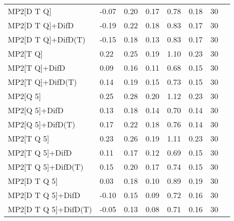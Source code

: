 \begin{table}
\begin{tabular}{l l l l l l l l }
    MP2[D T Q] & -0.07 & 0.20 & 0.17 & 0.78 & 0.18 & 30 \\ 
    MP2[D T Q]+DifD & -0.19 & 0.22 & 0.18 & 0.83 & 0.17 & 30 \\ 
    MP2[D T Q]+DifD(T) & -0.15 & 0.18 & 0.13 & 0.83 & 0.17 & 30 \\ 
    MP2[T Q] & 0.22 & 0.25 & 0.19 & 1.10 & 0.23 & 30 \\ 
    MP2[T Q]+DifD & 0.09 & 0.16 & 0.11 & 0.68 & 0.15 & 30 \\ 
    MP2[T Q]+DifD(T) & 0.14 & 0.19 & 0.15 & 0.73 & 0.15 & 30 \\ 
    MP2[Q 5] & 0.25 & 0.28 & 0.20 & 1.12 & 0.23 & 30 \\ 
    MP2[Q 5]+DifD & 0.13 & 0.18 & 0.14 & 0.70 & 0.14 & 30 \\ 
    MP2[Q 5]+DifD(T) & 0.17 & 0.22 & 0.18 & 0.76 & 0.14 & 30 \\ 
    MP2[T Q 5] & 0.23 & 0.26 & 0.19 & 1.11 & 0.23 & 30 \\ 
    MP2[T Q 5]+DifD & 0.11 & 0.17 & 0.12 & 0.69 & 0.15 & 30 \\ 
    MP2[T Q 5]+DifD(T) & 0.15 & 0.20 & 0.17 & 0.74 & 0.15 & 30 \\ 
    MP2[D T Q 5] & 0.03 & 0.18 & 0.10 & 0.89 & 0.19 & 30 \\ 
    MP2[D T Q 5]+DifD & -0.10 & 0.15 & 0.09 & 0.72 & 0.16 & 30 \\ 
    MP2[D T Q 5]+DifD(T) & -0.05 & 0.13 & 0.08 & 0.71 & 0.16 & 30 \\ 
    \bottomrule
  \end{tabular}
\end{table}

